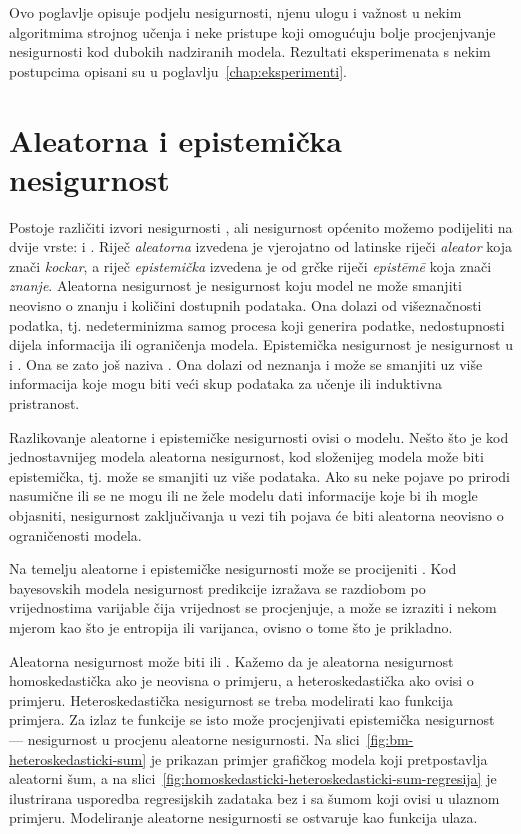 \documentclass[utf8, diplomski, lmodern]{fer}
\begin{document}
Ovo poglavlje opisuje podjelu nesigurnosti, njenu ulogu i važnost u nekim algoritmima strojnog učenja i neke pristupe koji omogućuju bolje procjenjvanje nesigurnosti kod dubokih nadziranih modela. Rezultati eksperimenata s nekim postupcima opisani su u poglavlju~\ref{chap:eksperimenti}.


\section{Aleatorna i epistemička nesigurnost}

Postoje različiti izvori nesigurnosti \citep{Kennedy:2002:BCCM}, ali nesigurnost općenito možemo podijeliti na dvije vrste:  i  \citep{Kiureghian:2009:AEDM}. Riječ \textit{aleatorna} izvedena je vjerojatno od latinske riječi \textit{aleator} \citep{Gal:2016:UDL} koja znači \textit{kockar}, a riječ \textit{epistemička} izvedena je od grčke riječi \textit{epist\={e}m\={e}} koja znači \textit{znanje}. Aleatorna nesigurnost je nesigurnost koju model ne može smanjiti neovisno o znanju i količini dostupnih podataka. Ona dolazi od višeznačnosti podatka, tj. nedeterminizma samog procesa koji generira podatke, nedostupnosti dijela informacija ili ograničenja modela. Epistemička nesigurnost je nesigurnost u  i  \citep{Gal:2016:UDL}. Ona se zato još naziva . Ona dolazi od neznanja i može se smanjiti uz više informacija koje mogu biti veći skup podataka za učenje ili induktivna pristranost.

Razlikovanje aleatorne i epistemičke nesigurnosti ovisi o modelu. Nešto što je kod jednostavnijeg modela aleatorna nesigurnost, kod složenijeg modela može biti epistemička, tj. može se smanjiti uz više podataka. Ako su neke pojave po prirodi nasumične ili se ne mogu ili ne žele modelu dati informacije koje bi ih mogle objasniti, nesigurnost zaključivanja u vezi tih pojava će biti aleatorna neovisno o ograničenosti modela.

Na temelju aleatorne i epistemičke nesigurnosti može se procijeniti . Kod bayesovskih modela nesigurnost predikcije izražava se razdiobom po vrijednostima varijable čija vrijednost se procjenjuje, a može se izraziti i nekom mjerom kao što je entropija ili varijanca, ovisno o tome što je prikladno.

Aleatorna nesigurnost može biti  ili . Kažemo da je aleatorna nesigurnost homoskedastička ako je neovisna o primjeru, a heteroskedastička ako ovisi o primjeru. Heteroskedastička nesigurnost se treba modelirati kao funkcija primjera. Za izlaz te funkcije se isto može procjenjivati epistemička nesigurnost --- nesigurnost u procjenu aleatorne nesigurnosti. Na slici~\ref{fig:bm-heteroskedasticki-sum} je prikazan primjer grafičkog modela koji pretpostavlja aleatorni šum, a na slici~\ref{fig:homoskedasticki-heteroskedasticki-sum-regresija} je ilustrirana usporedba regresijskih zadataka bez i sa šumom koji ovisi u ulaznom primjeru. Modeliranje aleatorne nesigurnosti se ostvaruje kao funkcija ulaza.
\end{document}
